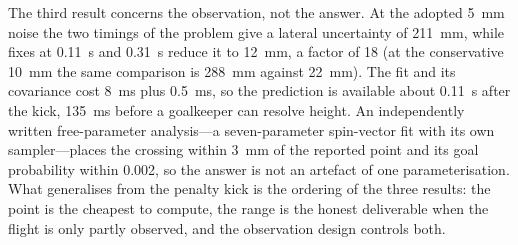 The third result concerns the observation, not the answer. At the adopted
\SI{5}{mm} noise the two timings of the problem give a lateral uncertainty of
\SI{211}{mm}, while fixes at \SI{0.11}{s} and \SI{0.31}{s} reduce it to
\SI{12}{mm}, a factor of \num{18} (at the conservative \SI{10}{mm} the same
comparison is \SI{288}{mm} against \SI{22}{mm}). The fit and its covariance
cost \SI{8}{ms} plus \SI{0.5}{ms}, so the prediction is available about
\SI{0.11}{s} after the kick, \SI{135}{ms} before a goalkeeper can resolve
height. An independently written free-parameter analysis---a seven-parameter
spin-vector fit with its own sampler---places the crossing within \SI{3}{mm}
of the reported point and its goal probability within \num{0.002}, so the
answer is not an artefact of one parameterisation. What generalises from the
penalty kick is the ordering of the three results: the point is the cheapest
to compute, the range is the honest deliverable when the flight is only
partly observed, and the observation design controls both.
